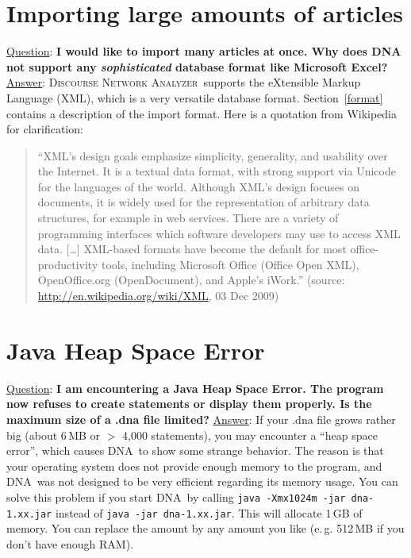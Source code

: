 \documentclass[12pt,a4paper]{scrreprt}
\newcommand{\dnalong}{\textsc{Discourse} \textsc{Network} \textsc{Analyzer}}
\newcommand{\dnashort}{\textsc{DNA}}
\newcommand{\code}[1]{\texttt{#1}}
\begin{document}
\section{Importing large amounts of articles}
\underline{Question}: \textbf{I would like to import many articles at once. Why does DNA not support any \emph{sophisticated} database format like Microsoft Excel?}
\vspace{0.3cm} \newline
\underline{Answer}: \dnalong\ supports the eXtensible Markup Language (XML), which is a very versatile database format. Section~\ref{format} contains a description of the import format. Here is a quotation from Wikipedia for clarification:
\begin{quote}
 ``XML's design goals emphasize simplicity, generality, and usability over the Internet. It is a textual data format, with strong support via Unicode for the languages of the world. Although XML's design focuses on documents, it is widely used for the representation of arbitrary data structures, for example in web services. There are a variety of programming interfaces which software developers may use to access XML data. [\ldots] XML-based formats have become the default for most office-productivity tools, including Microsoft Office (Office Open XML), OpenOffice.org (OpenDocument), and Apple's iWork.'' (source: \url{http://en.wikipedia.org/wiki/XML}, 03 Dec 2009)
\end{quote}

\section{Java Heap Space Error}
\underline{Question}: \textbf{I am encountering a Java Heap Space Error. The program now refuses to create statements or display them properly. Is the maximum size of a .dna file limited?}
\vspace{0.3cm} \newline
\underline{Answer}: If your .dna file grows rather big (about 6\,MB or $>$ 4,000 statements), you may encounter a ``heap space error'', which causes \dnashort\ to show some strange behavior. The reason is that your operating system does not provide enough memory to the program, and \dnashort\ was not designed to be very efficient regarding its memory usage. You can solve this problem if you start \dnashort\ by calling \code{java -Xmx1024m -jar dna-1.xx.jar} instead of \code{java -jar dna-1.xx.jar}. This will allocate 1\,GB of memory. You can replace the amount by any amount you like (e.\,g. 512\,MB if you don't have enough RAM).
\end{document}
